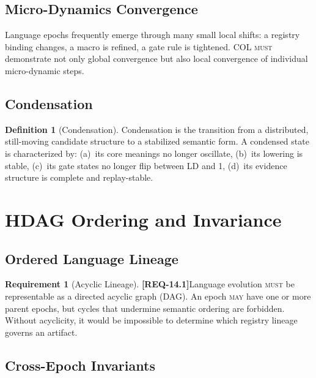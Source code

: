 \documentclass[11pt,a4paper,twoside]{article}
\theoremstyle{definition}
\newtheorem{requirement}{Requirement}[section]
\newtheorem{definition}{Definition}[section]
\theoremstyle{remark}
\newcommand{\req}[1]{\textbf{\textcolor{reqred}{[REQ-#1]}}}
\newcommand{\must}{\textsc{must}}
\newcommand{\may}{\textsc{may}}
\begin{document}
\subsection{Micro-Dynamics Convergence}

Language epochs frequently emerge through many small local shifts: a registry binding changes, a macro is refined, a gate rule is tightened. COL \must{} demonstrate not only global convergence but also local convergence of individual micro-dynamic steps.

\subsection{Condensation}

\begin{definition}[Condensation]
Condensation is the transition from a distributed, still-moving candidate structure to a stabilized semantic form. A condensed state is characterized by: (a)~its core meanings no longer oscillate, (b)~its lowering is stable, (c)~its gate states no longer flip between LD and 1, (d)~its evidence structure is complete and replay-stable.
\end{definition}



\section{HDAG Ordering and Invariance}
\label{sec:hdag}

\subsection{Ordered Language Lineage}

\begin{requirement}[Acyclic Lineage]
\label{req:acyclic}
\req{14.1}\quad Language evolution \must{} be representable as a directed acyclic graph (DAG). An epoch \may{} have one or more parent epochs, but cycles that undermine semantic ordering are forbidden. Without acyclicity, it would be impossible to determine which registry lineage governs an artifact.
\end{requirement}

\subsection{Cross-Epoch Invariants}
\end{document}
